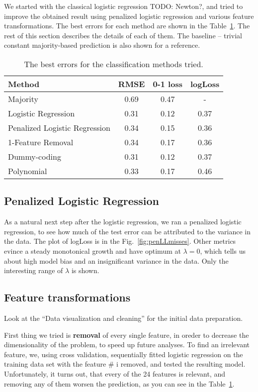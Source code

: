 \documentclass{article} %
\newcommand{\todo}[1]{}
\renewcommand{\todo}[1]{{\color{red} TODO: {#1}}}
\begin{document}
We started with the classical logistic regression \todo{Newton?}, and tried to improve the obtained result using penalized logistic regression and various feature transformations. The best errors for each method are shown in the Table~\ref{tab:classification-errors}. The rest of this section describes the details of each of them. The baseline -- trivial constant majority-based prediction is also shown for a reference.
\begin{table}[h]
  \begin{center}
    \begin{tabular}{l|ccc}
      Method & RMSE & 0-1 loss & logLoss \\
      \hline
      Majority & 0.69 & 0.47 & - \\
      Logistic Regression & 0.31 & 0.12 & 0.37 \\
      Penalized Logistic Regression & 0.34 & 0.15 & 0.36  \\
      1-Feature Removal & 0.34 & 0.17 & 0.36 \\
      Dummy-coding & 0.31 & 0.12 & 0.37 \\
      Polynomial & 0.33 & 0.17 & 0.46
    \end{tabular}
    \caption{The best errors for the classification methods tried.}
    \label{tab:classification-errors}
  \end{center}
\end{table}

\subsection{Penalized Logistic Regression}
As a natural next step after the logistic regression, we ran a penalized logistic regression, to see how much of the test error can be attributed to the variance in the data. The plot of logLoss is in the Fig.~\ref{fig:penLLmisses}. Other metrics evince a steady monotonical growth and have optimum at $\lambda = 0$, which tells us about high model bias and an insignificant variance in the data. Only the interesting range of $\lambda$ is shown.

\subsection{Feature transformations}
Look at the ``Data visualization and cleaning'' for the initial data preparation.

First thing we tried is {\bf removal} of every single feature, in oreder to decrease the dimensionality of the problem, to speed up future analyses. To find an irrelevant feature, we, using cross validation, sequentially fitted logistic regression on the training data set with the feature \# i removed, and tested the resulting model. Unfortunately, it turns out, that every of the 24 features is relevant, and removing any of them worsen the prediction, as you can see in the Table~\ref{tab:classification-errors}.
\end{document}
